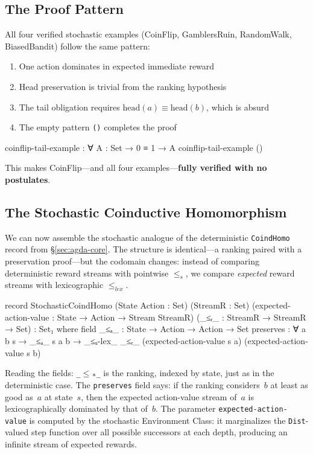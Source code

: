 \documentclass[9pt,a4paper]{article}
\theoremstyle{plain}
\theoremstyle{definition}
\theoremstyle{remark}
\begin{document}
\subsection{The Proof Pattern}

All four verified stochastic examples (CoinFlip, GamblersRuin, RandomWalk, BiasedBandit) follow the same pattern:

\begin{enumerate}
\item One action dominates in expected immediate reward
\item Head preservation is trivial from the ranking hypothesis
\item The tail obligation requires $\text{head}(a) \equiv \text{head}(b)$, which is absurd
\item The empty pattern \texttt{()} completes the proof
\end{enumerate}

\begin{code}
  coinflip-tail-example : ∀ {A : Set} → 0 ≡ 1 → A
  coinflip-tail-example ()
\end{code}

\noindent This makes CoinFlip---and all four examples---\textbf{fully verified with no postulates}.

\subsection{The Stochastic Coinductive Homomorphism}

We can now assemble the stochastic analogue of the deterministic \texttt{CoindHomo} record from \S\ref{sec:agda-core}.  The structure is identical---a ranking paired with a preservation proof---but the codomain changes: instead of comparing deterministic reward streams with pointwise $\le_s$, we compare \emph{expected} reward streams with lexicographic $\le_{lex}$.

\begin{code}
  record StochasticCoindHomo 
    (State Action : Set) (StreamR : Set)
    (expected-action-value : State → Action → Stream StreamR)
    (_≤ᵣ_ : StreamR → StreamR → Set) : Set₁ where
    field
      _≤ₐ_     : State → Action → Action → Set
      preserves : ∀ a b s → _≤ₐ_ s a b →
                  _≤ₛ-lex_ _≤ᵣ_ (expected-action-value s a) (expected-action-value s b)
\end{code}

\noindent Reading the fields: \texttt{\_$\le$ₐ\_} is the ranking, indexed by state, just as in the deterministic case.  The \texttt{preserves} field says: if the ranking considers~$b$ at least as good as~$a$ at state~$s$, then the expected action-value stream of~$a$ is lexicographically dominated by that of~$b$.  The parameter \texttt{expected-action-value} is computed by the stochastic Environment Class: it marginalizes the \texttt{Dist}-valued step function over all possible successors at each depth, producing an infinite stream of expected rewards.
\end{document}
